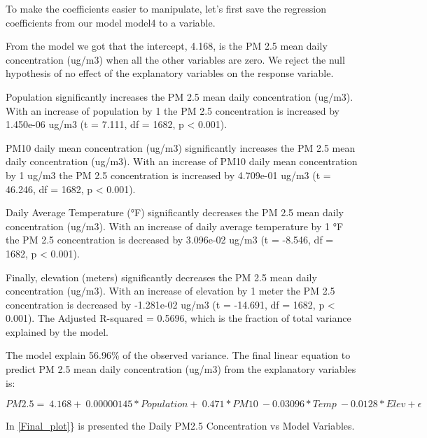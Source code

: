 \documentclass[12pt,]{article}
\begin{document}
To make the coefficients easier to manipulate, let's first save the
regression coefficients from our model model4 to a variable.

From the model we got that the intercept, 4.168, is the PM 2.5 mean
daily concentration (ug/m3) when all the other variables are zero. We
reject the null hypothesis of no effect of the explanatory variables on
the response variable.

Population significantly increases the PM 2.5 mean daily concentration
(ug/m3). With an increase of population by 1 the PM 2.5 concentration is
increased by 1.450e-06 ug/m3 (t = 7.111, df = 1682, p \textless{}
0.001).

PM10 daily mean concentration (ug/m3) significantly increases the PM 2.5
mean daily concentration (ug/m3). With an increase of PM10 daily mean
concentration by 1 ug/m3 the PM 2.5 concentration is increased by
4.709e-01 ug/m3 (t = 46.246, df = 1682, p \textless{} 0.001).

Daily Average Temperature (°F) significantly decreases the PM 2.5 mean
daily concentration (ug/m3). With an increase of daily average
temperature by 1 °F the PM 2.5 concentration is decreased by 3.096e-02
ug/m3 (t = -8.546, df = 1682, p \textless{} 0.001).

Finally, elevation (meters) significantly decreases the PM 2.5 mean
daily concentration (ug/m3). With an increase of elevation by 1 meter
the PM 2.5 concentration is decreased by -1.281e-02 ug/m3 (t = -14.691,
df = 1682, p \textless{} 0.001). The Adjusted R-squared = 0.5696, which
is the fraction of total variance explained by the model.

The model explain 56.96\% of the observed variance. The final linear
equation to predict PM 2.5 mean daily concentration (ug/m3) from the
explanatory variables is:

\[ PM2.5 = \ 4.168 + \ 0.00000145*Population + \ 0.471*PM10  \ -0.03096*Temp \ -0.0128*Elev + \epsilon \]

In \autoref{Final_plot}\} is presented the Daily PM2.5 Concentration vs
Model Variables.
\end{document}
